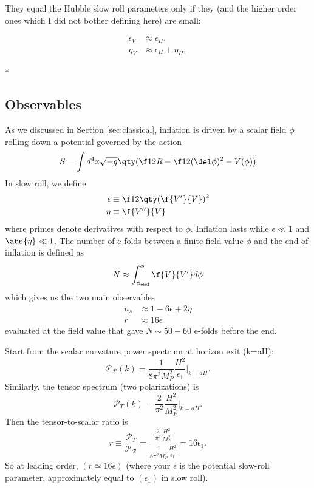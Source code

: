 They equal the Hubble slow roll parameters only if they (and the higher order ones which I did not bother defining here) are small:

$$
\begin{aligned}
\epsilon_V & \approx \epsilon_H, \\
\eta_V & \approx \epsilon_H+\eta_H,
\end{aligned}
$$


* 


\subsection{Observables}

As we discussed in Section \ref{sec:classical}, inflation is driven by a scalar field $\phi$ rolling down a potential governed by the action
\begin{equation}
    S=\int d^4x \sqrt{-g}\qty(\f12 R-\f12(\del \phi)^2-V(\phi))
\end{equation}
In slow roll, we define
\begin{align}
    \epsilon&\equiv \f12\qty(\f{V'}{V})^2\\
    \eta&\equiv \f{V''}{V}
\end{align}
where primes denote derivatives with respect to $\phi$. Inflation lasts while $\epsilon\ll1$ and $\abs{\eta}\ll 1$. The number of e-folds between a finite field value $\phi$ and the end of inflation is defined as
\begin{equation}
    N\approx \int_{\phi_{\rm end}}^\phi \f{V}{V'}d\phi
\end{equation}
which gives us the two main observables 
\begin{align}
    n_s&\approx 1-6\epsilon+2\eta\\
    r&\approx 16\epsilon
\end{align}
evaluated at the field value that gave $N\sim 50-60$ e-folds before the end.






 Start from the scalar curvature power spectrum at horizon exit (k=aH):  
$$
\mathcal P_\mathcal R(k)=\frac{1}{8\pi^2M_P^2}\frac{H^2}{\epsilon_1}\Bigg|_{k=aH}.  
$$
Similarly, the tensor spectrum (two polarizations) is  
$$
\mathcal P_T(k)=\frac{2}{\pi^2}\frac{H^2}{M_P^2}\Bigg|_{k=aH}.  
$$
Then the tensor-to-scalar ratio is  
$$
r \equiv \frac{\mathcal P_T}{\mathcal P_\mathcal R}=\frac{
\frac{2}{\pi^2}\frac{H^2}{M_P^2}
}{
\frac{1}{8\pi^2M_P^2} 
\frac{H^2}{\epsilon_1}}=16\epsilon_1.  
$$
So at leading order, $(r\simeq 16\epsilon)$ (where your $\epsilon$ is the potential slow-roll parameter, approximately equal to $(\epsilon_1)$ in slow roll).

